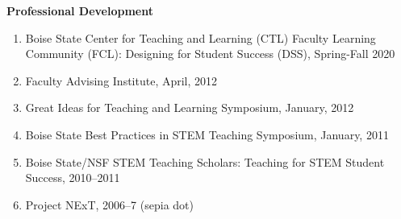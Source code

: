 \documentclass[12pt]{article}
\begin{document}
\textbf{Professional Development}
\begin{enumerate}[revarabic]
\item Boise State Center for Teaching and Learning (CTL) Faculty Learning Community (FCL): Designing for Student Success (DSS), Spring-Fall 2020
\item Faculty Advising Institute, April, 2012
\item Great Ideas for Teaching and Learning Symposium, January, 2012
\item Boise State Best Practices in STEM Teaching Symposium, January, 2011
\item Boise State/NSF STEM Teaching Scholars: Teaching for STEM Student Success, 2010--2011
\item Project NExT, 2006--7 (sepia dot)%
\end{enumerate}
\end{document}

